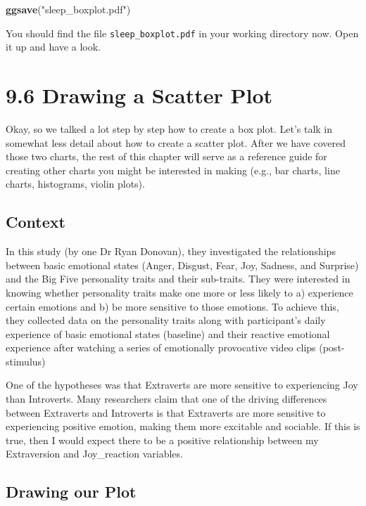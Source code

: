 \documentclass[
]{book}
\newenvironment{Shaded}{\begin{snugshade}}{\end{snugshade}}
\newcommand{\FunctionTok}[1]{\textcolor[rgb]{0.13,0.29,0.53}{\textbf{#1}}}
\newcommand{\NormalTok}[1]{#1}
\newcommand{\StringTok}[1]{\textcolor[rgb]{0.31,0.60,0.02}{#1}}
\begin{document}
\begin{Shaded}
\begin{Highlighting}[]
\FunctionTok{ggsave}\NormalTok{(}\StringTok{"sleep\_boxplot.pdf"}\NormalTok{)}
\end{Highlighting}
\end{Shaded}

You should find the file \texttt{sleep\_boxplot.pdf} in your working directory now. Open it up and have a look.

\section{9.6 Drawing a Scatter Plot}\label{drawing-a-scatter-plot}

Okay, so we talked a lot step by step how to create a box plot. Let's talk in somewhat less detail about how to create a scatter plot. After we have covered those two charts, the rest of this chapter will serve as a reference guide for creating other charts you might be interested in making (e.g., bar charts, line charts, histograms, violin plots).

\subsection{Context}\label{context}

In this study (by one Dr Ryan Donovan), they investigated the relationships between basic emotional states (Anger, Disgust, Fear, Joy, Sadness, and Surprise) and the Big Five personality traits and their sub-traits. They were interested in knowing whether personality traits make one more or less likely to a) experience certain emotions and b) be more sensitive to those emotions. To achieve this, they collected data on the personality traits along with participant's daily experience of basic emotional states (baseline) and their reactive emotional experience after watching a series of emotionally provocative video clips (post-stimulus)

One of the hypotheses was that Extraverts are more sensitive to experiencing Joy than Introverts. Many researchers claim that one of the driving differences between Extraverts and Introverts is that Extraverts are more sensitive to experiencing positive emotion, making them more excitable and sociable. If this is true, then I would expect there to be a positive relationship between my Extraversion and Joy\_reaction variables.

\subsection{Drawing our Plot}\label{drawing-our-plot}
\end{document}
